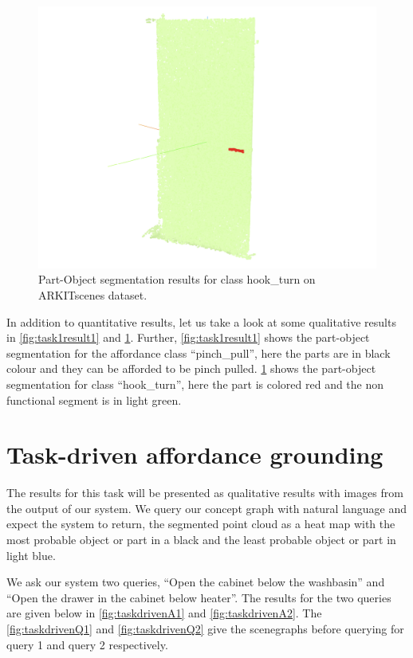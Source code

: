 \begin{figure}[ht!]
    \centering
    \includegraphics[width=\textwidth]{content/images/results/PartObj2.png}
    \caption{Part-Object segmentation results for class hook\_turn on ARKITscenes dataset.}
    \label{fig:task1result2}
\end{figure}
In addition to quantitative results, let us take a look at some qualitative results in \cref{fig:task1result1} and \cref{fig:task1result2}. 
Further, \cref{fig:task1result1} shows the part-object segmentation for the affordance class \enquote{pinch\_pull}, here the parts are in black colour and
they can be afforded to be pinch pulled. \cref{fig:task1result2} shows the part-object segmentation for class \enquote{hook\_turn}, here
the part is colored red and the non functional segment is in light green.

\section{Task-driven affordance grounding}
\label{sec:TDAG}
The results for this task will be presented as qualitative results with images from the output of our system. We query our concept graph with natural language
 and expect the system to return, the segmented point cloud as a heat map with the most probable object or part in a black and 
 the least probable object or part in light blue. 

We ask our system two queries, \enquote{Open the cabinet below the washbasin} and \enquote{Open the drawer in the cabinet below heater}. 
The results for the two queries are given below in \cref{fig:taskdrivenA1} and \cref{fig:taskdrivenA2}. The \cref{fig:taskdrivenQ1} and \cref{fig:taskdrivenQ2} 
give the scenegraphs before querying for query 1 and query 2 respectively.

